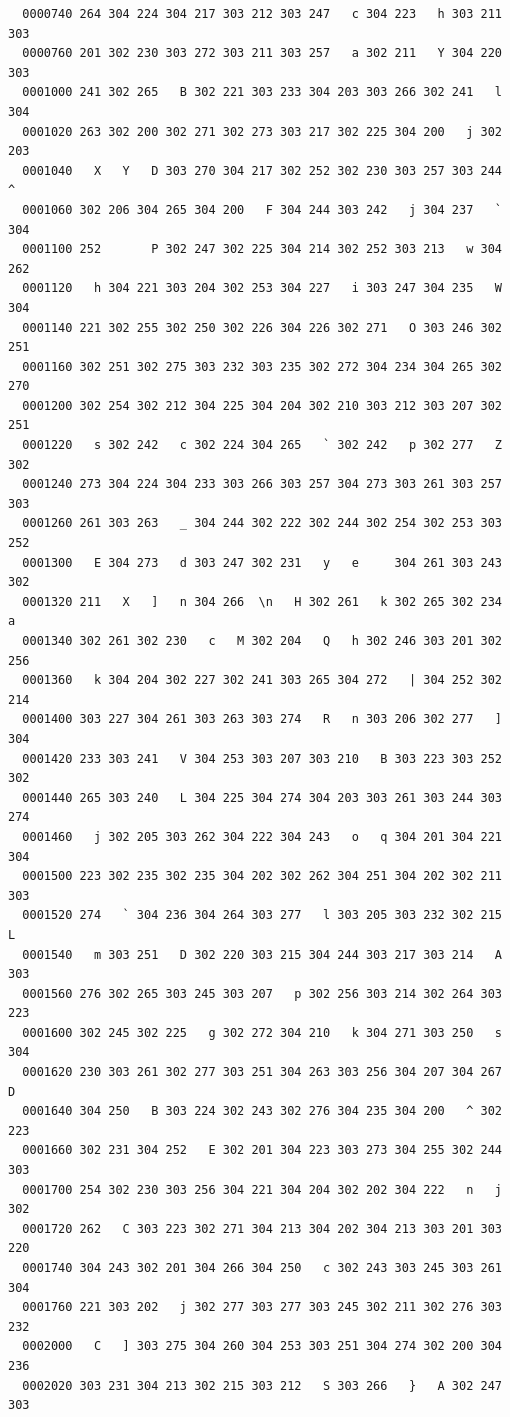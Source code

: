 \documentclass[a4paper,10pt, spanish]{article}
\begin{document}
\begin{lstlisting}
  0000740 264 304 224 304 217 303 212 303 247   c 304 223   h 303 211 303
  0000760 201 302 230 303 272 303 211 303 257   a 302 211   Y 304 220 303
  0001000 241 302 265   B 302 221 303 233 304 203 303 266 302 241   l 304
  0001020 263 302 200 302 271 302 273 303 217 302 225 304 200   j 302 203
  0001040   X   Y   D 303 270 304 217 302 252 302 230 303 257 303 244   ^
  0001060 302 206 304 265 304 200   F 304 244 303 242   j 304 237   ` 304
  0001100 252       P 302 247 302 225 304 214 302 252 303 213   w 304 262
  0001120   h 304 221 303 204 302 253 304 227   i 303 247 304 235   W 304
  0001140 221 302 255 302 250 302 226 304 226 302 271   O 303 246 302 251
  0001160 302 251 302 275 303 232 303 235 302 272 304 234 304 265 302 270
  0001200 302 254 302 212 304 225 304 204 302 210 303 212 303 207 302 251
  0001220   s 302 242   c 302 224 304 265   ` 302 242   p 302 277   Z 302
  0001240 273 304 224 304 233 303 266 303 257 304 273 303 261 303 257 303
  0001260 261 303 263   _ 304 244 302 222 302 244 302 254 302 253 303 252
  0001300   E 304 273   d 303 247 302 231   y   e     304 261 303 243 302
  0001320 211   X   ]   n 304 266  \n   H 302 261   k 302 265 302 234   a
  0001340 302 261 302 230   c   M 302 204   Q   h 302 246 303 201 302 256
  0001360   k 304 204 302 227 302 241 303 265 304 272   | 304 252 302 214
  0001400 303 227 304 261 303 263 303 274   R   n 303 206 302 277   ] 304
  0001420 233 303 241   V 304 253 303 207 303 210   B 303 223 303 252 302
  0001440 265 303 240   L 304 225 304 274 304 203 303 261 303 244 303 274
  0001460   j 302 205 303 262 304 222 304 243   o   q 304 201 304 221 304
  0001500 223 302 235 302 235 304 202 302 262 304 251 304 202 302 211 303
  0001520 274   ` 304 236 304 264 303 277   l 303 205 303 232 302 215   L
  0001540   m 303 251   D 302 220 303 215 304 244 303 217 303 214   A 303
  0001560 276 302 265 303 245 303 207   p 302 256 303 214 302 264 303 223
  0001600 302 245 302 225   g 302 272 304 210   k 304 271 303 250   s 304
  0001620 230 303 261 302 277 303 251 304 263 303 256 304 207 304 267   D
  0001640 304 250   B 303 224 302 243 302 276 304 235 304 200   ^ 302 223
  0001660 302 231 304 252   E 302 201 304 223 303 273 304 255 302 244 303
  0001700 254 302 230 303 256 304 221 304 204 302 202 304 222   n   j 302
  0001720 262   C 303 223 302 271 304 213 304 202 304 213 303 201 303 220
  0001740 304 243 302 201 304 266 304 250   c 302 243 303 245 303 261 304
  0001760 221 303 202   j 302 277 303 277 303 245 302 211 302 276 303 232
  0002000   C   ] 303 275 304 260 304 253 303 251 304 274 302 200 304 236
  0002020 303 231 304 213 302 215 303 212   S 303 266   }   A 302 247 303

\end{lstlisting}
\end{document}
